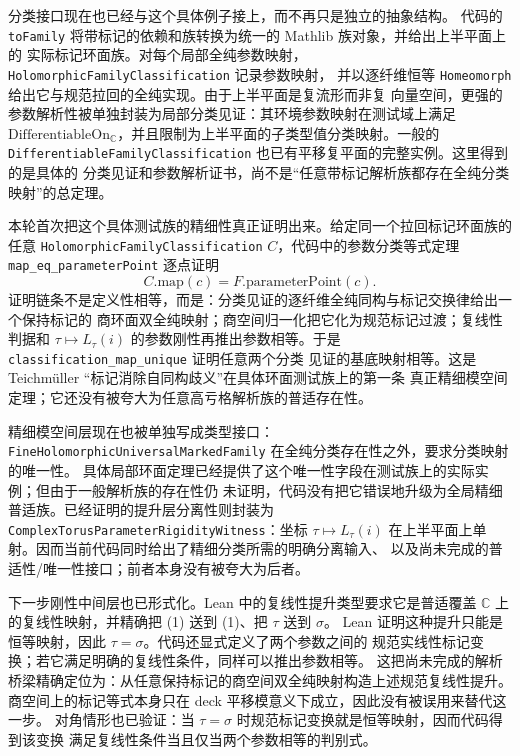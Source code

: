 \documentclass[UTF8,fontset=none,a4paper,11pt]{ctexart}
\begin{document}
分类接口现在也已经与这个具体例子接上，而不再只是独立的抽象结构。
代码的 \texttt{toFamily} 将带标记的依赖和族转换为统一的 Mathlib 族对象，并给出上半平面上的
实际标记环面族。对每个局部全纯参数映射，\texttt{HolomorphicFamilyClassification} 记录参数映射，
并以逐纤维恒等 \texttt{Homeomorph} 给出它与规范拉回的全纯实现。由于上半平面是复流形而非复
向量空间，更强的参数解析性被单独封装为局部分类见证：其环境参数映射在测试域上满足
\(\mathrm{DifferentiableOn}_{\mathbb C}\)，并且限制为上半平面的子类型值分类映射。一般的
\texttt{DifferentiableFamilyClassification} 也已有平移复平面的完整实例。这里得到的是具体的
分类见证和参数解析证书，尚不是“任意带标记解析族都存在全纯分类映射”的总定理。

本轮首次把这个具体测试族的精细性真正证明出来。给定同一个拉回标记环面族的任意
\texttt{HolomorphicFamilyClassification} \(C\)，代码中的参数分类等式定理
\texttt{map\_eq\_parameterPoint}
逐点证明
\[
 C.\mathrm{map}(c)=F.\mathrm{parameterPoint}(c).
\]
证明链条不是定义性相等，而是：分类见证的逐纤维全纯同构与标记交换律给出一个保持标记的
商环面双全纯映射；商空间归一化把它化为规范标记过渡；复线性判据和
\(\tau\mapsto L_\tau(i)\) 的参数刚性再推出参数相等。于是
\texttt{classification\_map\_unique} 证明任意两个分类
见证的基底映射相等。这是 Teichmüller “标记消除自同构歧义”在具体环面测试族上的第一条
真正精细模空间定理；它还没有被夸大为任意高亏格解析族的普适存在性。

精细模空间层现在也被单独写成类型接口：
\texttt{FineHolomorphicUniversalMarkedFamily} 在全纯分类存在性之外，要求分类映射的唯一性。
具体局部环面定理已经提供了这个唯一性字段在测试族上的实际实例；但由于一般解析族的存在性仍
未证明，代码没有把它错误地升级为全局精细普适族。已经证明的提升层分离性则封装为
\texttt{ComplexTorusParameterRigidityWitness}：坐标
\(\tau\mapsto L_\tau(i)\) 在上半平面上单射。因而当前代码同时给出了精细分类所需的明确分离输入、
以及尚未完成的普适性/唯一性接口；前者本身没有被夸大为后者。

下一步刚性中间层也已形式化。Lean 中的复线性提升类型要求它是普适覆盖
\(\mathbb C\) 上的复线性映射，并精确把 (1) 送到 (1)、把 \(\tau\) 送到 \(\sigma\)。
Lean 证明这种提升只能是恒等映射，因此 \(\tau=\sigma\)。代码还显式定义了两个参数之间的
规范实线性标记变换；若它满足明确的复线性条件，同样可以推出参数相等。
这把尚未完成的解析桥梁精确定位为：从任意保持标记的商空间双全纯映射构造上述规范复线性提升。
商空间上的标记等式本身只在 deck 平移模意义下成立，因此没有被误用来替代这一步。
对角情形也已验证：当 \(\tau=\sigma\) 时规范标记变换就是恒等映射，因而代码得到该变换
满足复线性条件当且仅当两个参数相等的判别式。
\end{document}

